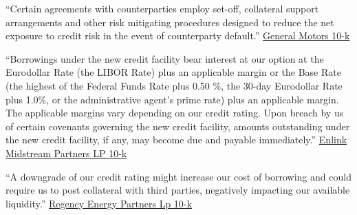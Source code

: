 \documentclass[a4paper, 12pt]{article}
\begin{document}
\begin{displayquote}
\begin{small}
\begin{singlespace}


``Certain agreements with counterparties employ set-off, collateral support arrangements and other risk mitigating procedures designed to reduce the net exposure to credit risk in the event of counterparty default.'' \href{https://www.sec.gov/Archives/edgar/data/1467858/000146785814000043/gm201310k.htm}{General Motors 10-k}
\end{singlespace}
\end{small}
\end{displayquote}


\begin{displayquote}
\begin{small}
\begin{singlespace}
``Borrowings under the new credit facility bear interest at our option at the Eurodollar Rate (the LIBOR Rate) plus an applicable margin or the Base Rate (the highest of the Federal Funds Rate plus 0.50 \%, the 30-day Eurodollar Rate plus 1.0\%, or the administrative agent’s prime rate) plus an applicable margin. The applicable margins vary depending on our credit rating. Upon breach by us of certain covenants governing the new credit facility, amounts outstanding under the new credit facility, if any, may become due and payable immediately.'' \href{https://www.sec.gov/Archives/edgar/data/1179060/000117906014000006/xtex201310-k.htm}{Enlink Midstream Partners LP 10-k}
\end{singlespace}
\end{small}
\end{displayquote}

\begin{displayquote}
\begin{small}
\begin{singlespace}
``A downgrade of our credit rating might increase our cost of borrowing and could require us to post collateral with third parties, negatively impacting our available liquidity.'' \href{https://www.sec.gov/Archives/edgar/data/1338613/000133861314000012/rgp1231201310-k.htm}{Regency Energy Partners Lp 10-k}
\end{singlespace}
\end{small}
\end{displayquote}
\end{document}
